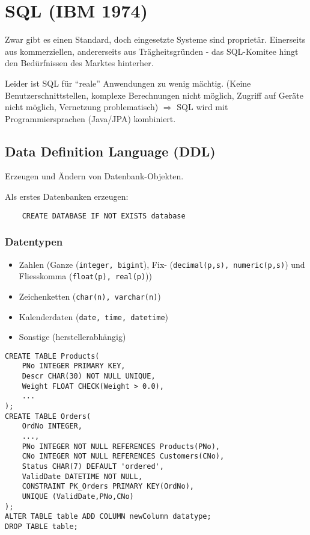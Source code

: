 \section{SQL (IBM 1974)}
Zwar gibt es einen Standard, doch eingesetzte Systeme sind proprietär. Einerseits aus kommerziellen, andererseits aus
Trägheitsgründen - das SQL-Komitee hingt den Bedürfnissen des Marktes hinterher.

Leider ist SQL für \enquote{reale} Anwendungen zu wenig mächtig. (Keine Benutzerschnittstellen, komplexe Berechnungen nicht möglich,
Zugriff auf Geräte nicht möglich, Vernetzung problematisch) $\Rightarrow$ SQL wird mit Programmiersprachen (Java/JPA) kombiniert.

\subsection{Data Definition Language (DDL)}
Erzeugen und Ändern von Datenbank-Objekten.

Als erstes Datenbanken erzeugen:
\begin{lstlisting}
	CREATE DATABASE IF NOT EXISTS database
\end{lstlisting}

\subsubsection{Datentypen}
\begin{itemize}\itemsep0em
	\item Zahlen (Ganze (\texttt{integer, bigint}), Fix- (\texttt{decimal(p,s), numeric(p,s)}) und Fliesskomma (\texttt{float(p), real(p)}))
	\item Zeichenketten (\texttt{char(n), varchar(n)})
	\item Kalenderdaten (\texttt{date, time, datetime})
	\item Sonstige (herstellerabhängig)
\end{itemize}

\begin{lstlisting}
CREATE TABLE Products(
	PNo INTEGER PRIMARY KEY,
	Descr CHAR(30) NOT NULL UNIQUE,
	Weight FLOAT CHECK(Weight > 0.0),
	...
);
CREATE TABLE Orders(
	OrdNo INTEGER,
	...,
	PNo INTEGER	NOT NULL REFERENCES Products(PNo),
	CNo INTEGER	NOT NULL REFERENCES Customers(CNo),
	Status CHAR(7) DEFAULT 'ordered',
	ValidDate DATETIME NOT NULL,
	CONSTRAINT PK_Orders PRIMARY KEY(OrdNo),
	UNIQUE (ValidDate,PNo,CNo)
);
ALTER TABLE table ADD COLUMN newColumn datatype;
DROP TABLE table;
\end{lstlisting}



